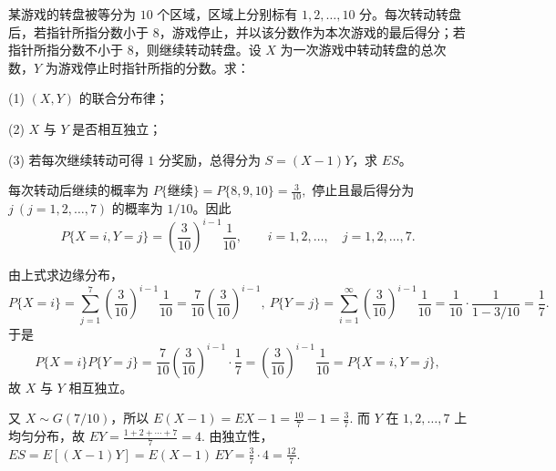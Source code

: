 \documentclass[lang=cn,11pt]{elegantbook}
\begin{document}
\begin{exercise}\label{exer:src-2012-a-08-2credit}
某游戏的转盘被等分为 \(10\) 个区域，区域上分别标有 \(1,2,\dots,10\) 分。每次转动转盘后，若指针所指分数小于 \(8\)，游戏停止，并以该分数作为本次游戏的最后得分；若指针所指分数不小于 \(8\)，则继续转动转盘。设 \(X\) 为一次游戏中转动转盘的总次数，\(Y\) 为游戏停止时指针所指的分数。求：\par
(1) \((X,Y)\) 的联合分布律；\par
(2) \(X\) 与 \(Y\) 是否相互独立；\par
(3) 若每次继续转动可得 \(1\) 分奖励，总得分为 \(S=(X-1)Y\)，求 \(ES\)。
\end{exercise}
\begin{solution}
每次转动后继续的概率为
\(
P\{\text{继续}\}=P\{8,9,10\}=\frac3{10},
\)
停止且最后得分为 \(j\ (j=1,2,\dots,7)\) 的概率为 \(1/10\)。因此
\[
P\{X=i,Y=j\}=\left(\frac3{10}\right)^{i-1}\frac1{10},
\qquad i=1,2,\dots,\quad j=1,2,\dots,7.
\]

由上式求边缘分布，
\[
P\{X=i\}=\sum_{j=1}^7\left(\frac3{10}\right)^{i-1}\frac1{10}
=\frac7{10}\left(\frac3{10}\right)^{i-1},~
P\{Y=j\}=\sum_{i=1}^{\infty}\left(\frac3{10}\right)^{i-1}\frac1{10}
=\frac1{10}\cdot\frac1{1-3/10}=\frac17.
\]
于是
\[
P\{X=i\}P\{Y=j\}
=\frac7{10}\left(\frac3{10}\right)^{i-1}\cdot\frac17
=\left(\frac3{10}\right)^{i-1}\frac1{10}
=P\{X=i,Y=j\},
\]
故 \(X\) 与 \(Y\) 相互独立。

又 \(X\sim G(7/10)\)，所以
\(
E(X-1)=EX-1=\frac{10}{7}-1=\frac37.
\)
而 \(Y\) 在 \(1,2,\dots,7\) 上均匀分布，故
\(
EY=\frac{1+2+\cdots+7}{7}=4.
\)
由独立性，
\(
ES=E[(X-1)Y]=E(X-1)\,EY=\frac37\cdot4=\frac{12}{7}.
\)
\end{solution}
\end{document}
